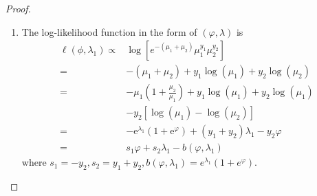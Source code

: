 \begin{proof}
    \begin{enumerate}
        \item
              The log-likelihood function in the form of $\left(\varphi,\lambda\right)$ is
              \begin{equation*}
                  \begin{aligned}
                      \ell\left(\phi,\lambda_{1}\right)\propto & \log\left[e^{-\left(\mu_{1}+\mu_{2}\right)}\mu_{1}^{y_{1}}\mu_{2}^{y_{2}}\right]                              \\
                      =                                        & -\left(\mu_{1}+\mu_{2}\right)+y_{1}\log\left(\mu_{1}\right)+y_{2}\log\left(\mu_{2}\right)                     \\
                      =                                        & -\mu_{1}\left(1+\frac{\mu_{2}}{\mu_{1}}\right)+y_{1}\log\left(\mu_{1}\right)+y_{2}\log\left(\mu_{1}\right)    \\
                                                               & -y_{2}\left[\log\left(\mu_{1}\right)-\log\left(\mu_{2}\right)\right]                                          \\
                      =                                        & -\mathrm{e}^{\lambda_{1}}\left(1+\mathrm{e}^{\varphi}\right)+\left(y_{1}+y_{2}\right)\lambda_{1}-y_{2}\varphi \\
                      =                                        & s_{1}\varphi+s_{2}\lambda_{1}-b\left(\varphi,\lambda_{1}\right)
                  \end{aligned}
              \end{equation*}
              where $s_{1}=-y_{2},s_{2}=y_{1}+y_{2},b\left(\varphi,\lambda_{1}\right)=e^{\lambda_{1}}\left(1+e^{\varphi}\right)$.


\end{enumerate}
\end{proof}
